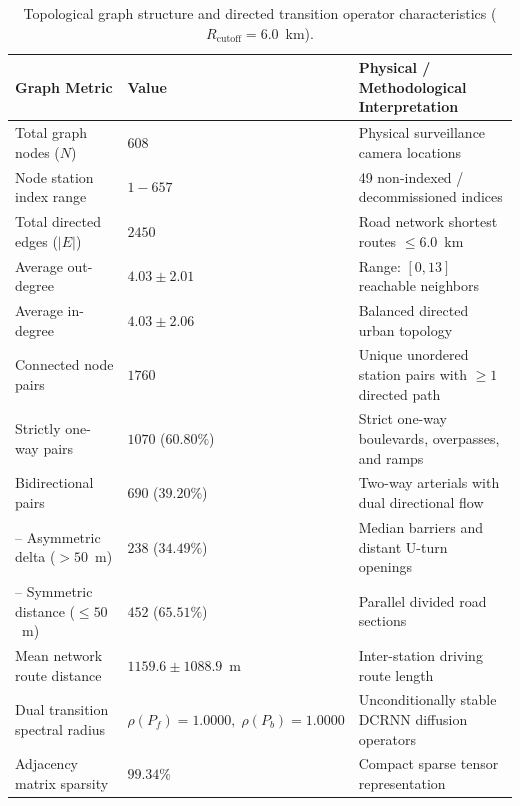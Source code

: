 \begin{table}[tbp]
\centering
\caption{Topological graph structure and directed transition operator characteristics ($R_{\text{cutoff}} = 6.0$~km).}
\label{tab:graph_metrics}
\small
\begin{tabular}{lll}
\hline
\textbf{Graph Metric} & \textbf{Value} & \textbf{Physical / Methodological Interpretation} \\
\hline
Total graph nodes ($N$) & $608$ & Physical surveillance camera locations \\
Node station index range & $1 - 657$ & 49 non-indexed / decommissioned indices \\
Total directed edges ($|E|$) & $2450$ & Road network shortest routes $\leq 6.0$~km \\
Average out-degree & $4.03 \pm 2.01$ & Range: $[0, 13]$ reachable neighbors \\
Average in-degree & $4.03 \pm 2.06$ & Balanced directed urban topology \\
Connected node pairs & $1760$ & Unique unordered station pairs with $\geq 1$ directed path \\
Strictly one-way pairs & $1070$ ($60.80\%$) & Strict one-way boulevards, overpasses, and ramps \\
Bidirectional pairs & $690$ ($39.20\%$) & Two-way arterials with dual directional flow \\
-- Asymmetric delta ($>50$~m) & $238$ ($34.49\%$) & Median barriers and distant U-turn openings \\
-- Symmetric distance ($\leq 50$~m) & $452$ ($65.51\%$) & Parallel divided road sections \\
Mean network route distance & $1159.6 \pm 1088.9$~m & Inter-station driving route length \\
Dual transition spectral radius & $\rho(P_f) = 1.0000,\; \rho(P_b) = 1.0000$ & Unconditionally stable DCRNN diffusion operators \\
Adjacency matrix sparsity & $99.34\%$ & Compact sparse tensor representation \\
\hline
\end{tabular}
\end{table}
